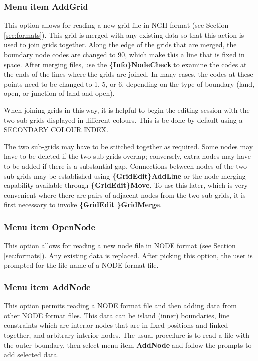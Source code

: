 \documentclass{article}
\begin{document}
\subsubsection[Menu item AddGrid]{Menu item AddGrid}
This option allows for reading a new grid file in NGH format (see Section \ref{sec:formats}). This grid is merged with any existing data so that this action is used to join grids together. Along the edge of the grids that are merged, the boundary node codes are changed to 90, which make this a line that is fixed in space. After merging files, use the \textbf{\{Info\}NodeCheck} to examine the codes at the ends of the lines where the grids are joined. In many cases, the codes at these points need to be changed to 1, 5, or 6, depending on the type of boundary (land, open, or junction of land and open).

When joining grids in this way, it is helpful to begin the editing session with the two sub-grids displayed in different colours. This is be done by default using a SECONDARY COLOUR INDEX.

The two sub-grids may have to be stitched together as required. Some nodes may have to be deleted if the two sub-grids overlap; conversely, extra nodes may have to be added if there is a substantial gap. Connections between nodes of the two sub-grids may be established using \textbf{\{GridEdit\}AddLine} or the node-merging capability available through \textbf{\{GridEdit\}Move}. To use this later, which is very convenient where there are pairs of adjacent nodes from the two sub-grids, it is first necessary to invoke \textbf{\{GridEdit \}GridMerge}.

\subsubsection[Menu item OpenNode]{Menu item OpenNode}
This option allows for reading a new node file in NODE format (see Section \ref{sec:formats}). Any existing data is replaced. After picking this option, the user is prompted for the file name of a NODE format file.

\subsubsection[Menu item AddNode]{Menu item AddNode}
This option permits reading a NODE format file and then adding data from other NODE format files. This data can be island (inner) boundaries, line constraints which are interior nodes that are in fixed positions and linked together, and arbitrary interior nodes. The usual procedure is to read a file with the outer boundary, then select menu item {\bf AddNode} and follow the prompts to add selected data. 
\end{document}

